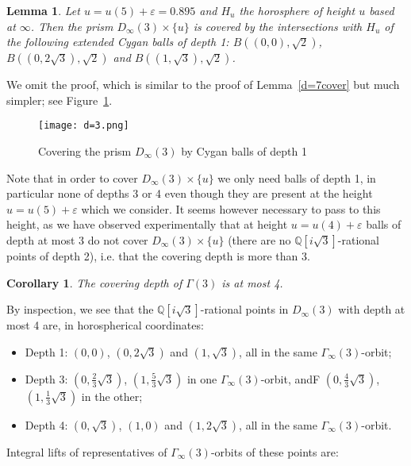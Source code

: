 \documentclass{article}[12pt]
\newcommand{\Q}{\mathbb{Q}}
\newtheorem{cor}{Corollary}
\newtheorem{lem}{Lemma}%
\begin{document}
\begin{lem}\label{d=3cover} Let $u=u(5)+\varepsilon=0.895$ and $H_u$ the horosphere of height $u$ based at $\infty$. Then the prism $D_\infty(3)\times \{ u \}$ is covered by the intersections with $H_u$ of the following extended Cygan balls of depth 1:  $B\left((0,0),\sqrt{2}\right)$, $B\left((0,2\sqrt{3}),\sqrt{2}\right)$ and $B\left((1,\sqrt{3}),\sqrt{2}\right)$.
\end{lem}
We omit the proof, which is similar to the proof of Lemma~\ref{d=7cover} but much simpler; see Figure~\ref{d=3pic}.

\begin{center}
\begin{figure}\label{d=3pic}
\caption{Covering the prism $D_\infty(3)$ by Cygan balls of depth 1}
\texttt{[image: d=3.png]}
\end{figure}
  \end{center}
  
  Note that in order to cover $D_\infty(3)\times \{ u \}$ we only need balls of depth 1, in particular none of depths 3 or 4 even though they are present at the height $u=u(5)+\varepsilon$ which we consider. It seems however necessary to pass to this height, as we have observed experimentally that at height $u=u(4)+\varepsilon$ balls of depth at most 3 do not cover $D_\infty(3)\times \{ u \}$ (there are no $\Q[i\sqrt{3}]$-rational points of depth 2), i.e. that the covering depth is more than 3.
  
\begin{cor} The covering depth of $\Gamma(3)$ is at most 4.
\end{cor}  

By inspection, we see that the $\Q[i\sqrt{3}]$-rational points in $D_\infty(3)$ with depth at most 4 are, in horospherical coordinates:

\begin{itemize}
\item Depth 1: $(0,0)$, $(0,2\sqrt{3})$ and $(1,\sqrt{3})$, all in the same $\Gamma_\infty(3)$-orbit;
\item Depth 3: $(0,\frac{2}{3}\sqrt{3})$, $(1,\frac{5}{3}\sqrt{3})$ in one $\Gamma_\infty(3)$-orbit, andF $(0,\frac{4}{3}\sqrt{3})$, $(1,\frac{1}{3}\sqrt{3})$ in the other;
  \item Depth 4:   $(0,\sqrt{3})$, $(1,0)$ and $(1,2\sqrt{3})$, all in the same $\Gamma_\infty(3)$-orbit.
  \end{itemize}

Integral lifts of representatives of $\Gamma_\infty(3)$-orbits of these points are:
\end{document}
